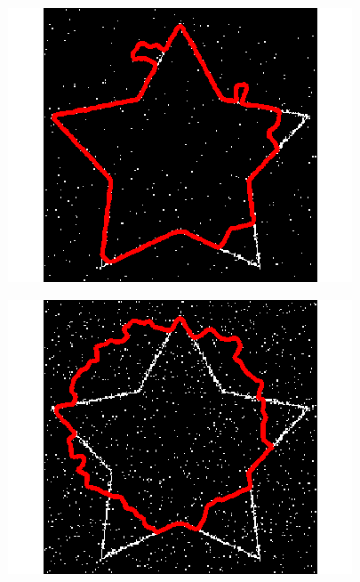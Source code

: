 \begin{figure}[H]
\centering
\begin{subfigure}[c]{0.3\linewidth}
\centering
\includegraphics[width=\textwidth]{Chapters/Images/Noise/gvfimp1}
\caption{}
\end{subfigure}
\begin{subfigure}[c]{0.3\linewidth}
\centering
\includegraphics[width=\textwidth]{Chapters/Images/Noise/gvfimp5}
\caption{}
\end{subfigure}
\begin{subfigure}[c]{0.3\linewidth}
\centering

\end{subfigure}
\end{figure}

